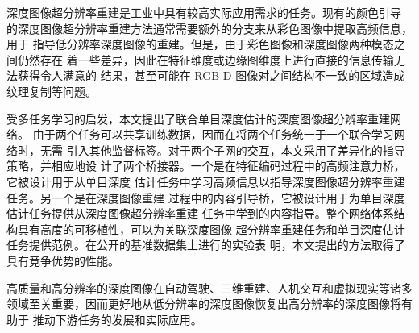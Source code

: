 \begin{chineseabstract}

	\noindent{}深度图像超分辨率重建是工业中具有较高实际应用需求的任务。现有的颜色引导 的深度图像超分辨率重建方法通常需要额外的分支来从彩色图像中提取高频信息，用于 指导低分辨率深度图像的重建。但是，由于彩色图像和深度图像两种模态之间仍然存在 着一些差异，因此在特征维度或边缘图维度上进行直接的信息传输无法获得令人满意的 结果，甚至可能在 RGB-D 图像对之间结构不一致的区域造成纹理复制等问题。
	
受多任务学习的启发，本文提出了联合单目深度估计的深度图像超分辨率重建网络。 由于两个任务可以共享训练数据，因而在将两个任务统一于一个联合学习网络时，无需 引入其他监督标签。对于两个子网的交互，本文采用了差异化的指导策略，并相应地设 计了两个桥接器。一个是在特征编码过程中的高频注意力桥，它被设计用于从单目深度 估计任务中学习高频信息以指导深度图像超分辨率重建任务。另一个是在深度图像重建 过程中的内容引导桥，它被设计用于为单目深度估计任务提供从深度图像超分辨率重建 任务中学到的内容指导。整个网络体系结构具有高度的可移植性，可以为关联深度图像 超分辨率重建任务和单目深度估计任务提供范例。在公开的基准数据集上进行的实验表 明，本文提出的方法取得了具有竞争优势的性能。

高质量和高分辨率的深度图像在自动驾驶、三维重建、人机交互和虚拟现实等诸多 领域至关重要，因而更好地从低分辨率的深度图像恢复出高分辨率的深度图像将有助于 推动下游任务的发展和实际应用。
	\newline		
	\newline
	\noindent {}
\end{chineseabstract}